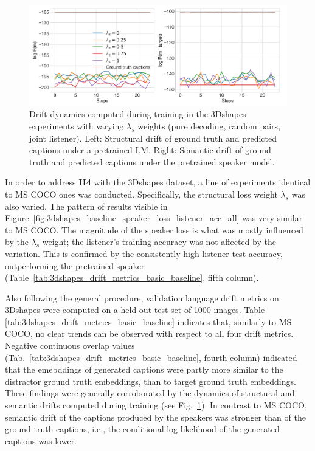 \begin{figure}[h]
	\centering
	\includegraphics[width=\linewidth]{images/shapes_structural_semantic_drift_49_pure_L_s_all_random.png}
	\caption{Drift dynamics computed during training in the 3Dshapes experiments with varying $\lambda_s$ weights (pure decoding, random pairs, joint listener). Left: Structural drift of ground truth and predicted captions under a pretrained LM. Right: Semantic drift of ground truth and predicted captions under the pretrained speaker model.} 
	\label{fig:3dshapes_baseline_all_str_sem_drift}
\end{figure}

In order to address \textbf{H4} with the 3Dshapes dataset, a line of experiments identical to MS COCO ones was conducted. Specifically, the structural loss weight $\lambda_s$ was also varied. The pattern of results visible in Figure~\ref{fig:3dshapes_baseline_speaker_loss_listener_acc_all} was very similar to MS COCO. The magnitude of the speaker loss is what was mostly influenced by the $\lambda_s$ weight; the listener's training accuracy was not affected by the variation. This is confirmed by the consistently high listener test accuracy, outperforming the pretrained speaker (Table~\ref{tab:3dshapes_drift_metrics_basic_baseline}, fifth column).%

Also following the general procedure, validation language drift metrics on 3Dshapes were computed on a held out test set of 1000 images. Table \ref{tab:3dshapes_drift_metrics_basic_baseline} indicates that, similarly to MS COCO, no clear trends can be observed with respect to all four drift metrics. Negative continuous overlap values (Tab.~\ref{tab:3dshapes_drift_metrics_basic_baseline}, fourth column) indicated that the emebddings of generated captions were partly more similar to the distractor ground truth embeddings, than to target ground truth embeddings. These findings were generally corroborated by the dynamics of structural and semantic drifts computed during training (see Fig.~\ref{fig:3dshapes_baseline_all_str_sem_drift}). In contrast to MS COCO, semantic drift of the captions produced by the speakers was stronger than of the ground truth captions, i.e., the conditional log likelihood of the generated captions was lower. 


